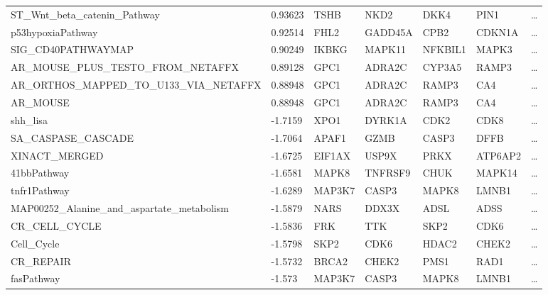 \documentclass{scrartcl}
\numberwithin{figure}{section}
\numberwithin{table}{section}
\begin{document}
\begin{table}[h!]
\begin{tabular}{lllllll}
  ST\_Wnt\_beta\_catenin\_Pathway                           & 0.93623 & TSHB     & NKD2    & DKK4    & PIN1    & \dots \\
  p53hypoxiaPathway                                         & 0.92514 & FHL2     & GADD45A & CPB2    & CDKN1A  & \dots \\
  SIG\_CD40PATHWAYMAP                                       & 0.90249 & IKBKG    & MAPK11  & NFKBIL1 & MAPK3   & \dots \\
  AR\_MOUSE\_PLUS\_TESTO\_FROM\_NETAFFX                     & 0.89128 & GPC1     & ADRA2C  & CYP3A5  & RAMP3   & \dots \\
  AR\_ORTHOS\_MAPPED\_TO\_U133\_VIA\_NETAFFX                & 0.88948 & GPC1     & ADRA2C  & RAMP3   & CA4     & \dots \\
  AR\_MOUSE                                                 & 0.88948 & GPC1     & ADRA2C  & RAMP3   & CA4     & \dots \\
\midrule
  shh\_lisa                                                 & -1.7159 & XPO1     & DYRK1A  & CDK2    & CDK8    & \dots \\
  SA\_CASPASE\_CASCADE                                      & -1.7064 & APAF1    & GZMB    & CASP3   & DFFB    & \dots \\
  XINACT\_MERGED                                            & -1.6725 & EIF1AX   & USP9X   & PRKX    & ATP6AP2 & \dots \\
  41bbPathway                                               & -1.6581 & MAPK8    & TNFRSF9 & CHUK    & MAPK14  & \dots \\
  tnfr1Pathway                                              & -1.6289 & MAP3K7   & CASP3   & MAPK8   & LMNB1   & \dots \\
  MAP00252\_Alanine\_and\_aspartate\_metabolism             & -1.5879 & NARS     & DDX3X   & ADSL    & ADSS    & \dots \\
  CR\_CELL\_CYCLE                                           & -1.5836 & FRK      & TTK     & SKP2    & CDK6    & \dots \\
  Cell\_Cycle                                               & -1.5798 & SKP2     & CDK6    & HDAC2   & CHEK2   & \dots \\
  CR\_REPAIR                                                & -1.5732 & BRCA2    & CHEK2   & PMS1    & RAD1    & \dots \\
  fasPathway                                                & -1.573  & MAP3K7   & CASP3   & MAPK8   & LMNB1   & \dots \\

\end{tabular}
\end{table}
\end{document}
